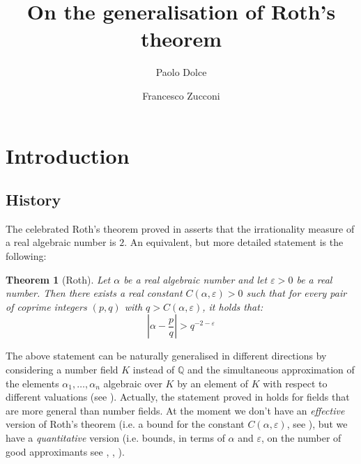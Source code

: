 \documentclass[10 pt,a4paper]{article}
\theoremstyle{plain}
\newtheorem{thm}{Theorem}[section]
\theoremstyle{definition}
\theoremstyle{named}
\begin{document}
 \title{On the generalisation of Roth's theorem}
\author{Paolo Dolce\and
  Francesco Zucconi}
\date{}
\maketitle
\makeatletter
{}
\makeatother




\setcounter{section}{-1}

\section{Introduction}
\subsection{History}\label{hi}
The celebrated Roth's theorem proved in \cite{roth} asserts that the irrationality measure of a real algebraic number is $2$. An equivalent, but more detailed statement is the following:
\begin{thm}[Roth]
Let $\alpha$ be a real algebraic number and let $\varepsilon>0$ be a real number. Then there exists a real constant $C(\alpha,\varepsilon)>0$ such that for every pair of coprime integers $(p,q)$ with $q>C(\alpha,\varepsilon)$, it holds that:
$$
\left|\alpha-\frac{p}{q}\right|> q^{-2-\varepsilon}
$$
\end{thm}

The above statement can be  naturally generalised in different directions by considering a number field $K$ instead of $\mathbb Q$ and the simultaneous approximation of the elements $\alpha_1,\ldots,\alpha_n$ algebraic over  $K$ by an element of $K$ with respect to different valuations (see \cite[Chapter 7]{lang}). Actually, the statement proved in \cite[Chapter 7]{lang} holds for fields that are more general than  number fields.  At the moment we don't have an \emph{effective} version of Roth's theorem  (i.e. a bound for the constant $C(\alpha,\varepsilon)$, see \cite{C1}), but we have a \emph{quantitative}  version (i.e.  bounds, in terms of $\alpha$ and $\varepsilon$, on the number of good approximants  see  \cite{bom}, \cite{bom1}, \cite{ever}).
\end{document}
